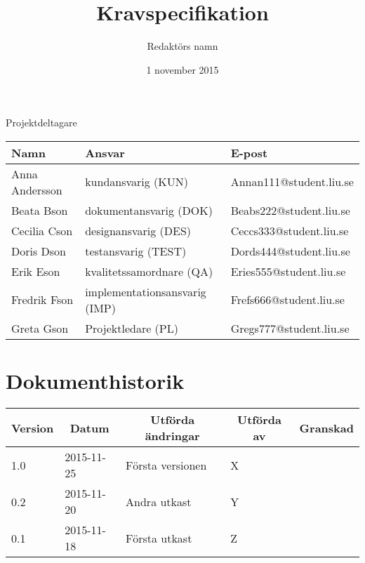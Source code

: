 \documentclass[10pt,oneside,swedish]{lips}
\title{Kravspecifikation}
\author{Redaktörs namn}
\date{1 november 2015}
\begin{document}
\maketitle

\cleardoublepage
\makeprojectid

\begin{center}
  \Large Projektdeltagare
\end{center}
\begin{center}
  \begin{tabular}{|l|l|l|}
    \hline
    \textbf{Namn} & \textbf{Ansvar} & \textbf{E-post}\\
    \hline
    Anna Andersson & kundansvarig (KUN) & Annan111@student.liu.se\\
    \hline
    Beata Bson & dokumentansvarig (DOK) & Beabs222@student.liu.se\\
    \hline
    Cecilia Cson & designansvarig (DES) & Ceccs333@student.liu.se\\
    \hline
    Doris Dson & testansvarig (TEST) & Dords444@student.liu.se\\
    \hline
    Erik Eson & kvalitetssamordnare (QA) & Eries555@student.liu.se\\
    \hline
    Fredrik Fson & implementationsansvarig (IMP) & Frefs666@student.liu.se\\
    \hline
    Greta Gson & Projektledare (PL) & Gregs777@student.liu.se\\
    \hline
  \end{tabular}
\end{center}

\cleardoublepage
\tableofcontents

\cleardoublepage
\section*{Dokumenthistorik}
\begin{tabular}{p{}|p{}|p{}|p{}|p{}} 
  \multicolumn{1}{c}{\bfseries Version} & 
  \multicolumn{1}{|c}{\bfseries Datum} & 
  \multicolumn{1}{|c}{\bfseries Utförda ändringar} & 
  \multicolumn{1}{|c}{\bfseries Utförda av} & 
  \multicolumn{1}{|c}{\bfseries Granskad}\\
  \hline
  \hline
  1.0 & 2015-11-25 & Första versionen & X &    \\
  \hline
  0.2 & 2015-11-20 & Andra utkast & Y &    \\
  \hline
  0.1 & 2015-11-18 & Första utkast & Z &    \\
  \hline
\end{tabular}
\end{document}

